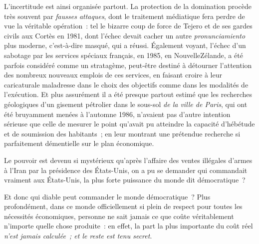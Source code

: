 \documentclass[french,twoside]{book} %
\def\bignobreak{\ifdim\lastskip<\bigskipamount
  \removelastskip\nopagebreak\bigskip\fi}
\newcommand{\labelblock}[1]{\bigbreak{\color{rubric}\noindent\textbf{#1}\par}\bignobreak}
\begin{document}
L’incertitude est ainsi organisée partout. La protection de la domination procède très souvent par \emph{fausses attaques}, dont le traitement médiatique fera perdre de vue la véritable opération : tel le bizarre coup de force de Tejero et de ses gardes civils aux Cortès en 1981, dont l’échec devait cacher un autre \emph{pronunciamiento} plus moderne, c’est-à-dire masqué, qui a réussi. Également voyant, l’échec d’un sabotage par les services spéciaux français, en 1985, en NouvelleZélande, a été parfois considéré comme un stratagème, peut-être destiné à détourner l’attention des nombreux nouveaux emplois de ces services, en faisant croire à leur caricaturale maladresse dans le choix des objectifs comme dans les modalités de l’exécution. Et plus assurément il a été presque partout estimé que les recherches géologiques d’un gisement pétrolier dans le sous-sol \emph{de la ville de Paris}, qui ont été bruyamment menées à l’automne 1986, n’avaient pas d’autre intention sérieuse que celle de mesurer le point qu’avait pu atteindre la capacité d’hébétude et de soumission des habitants ; en leur montrant une prétendue recherche si parfaitement démentielle sur le plan économique.\par
Le pouvoir est devenu si mystérieux qu’après l’affaire des ventes illégales d’armes à l’Iran par la présidence des États-Unis, on a pu se demander qui commandait vraiment aux États-Unis, la plus forte puissance du monde dit démocratique ?\par
Et donc qui diable peut commander le monde démocratique ? Plus profondément, dans ce monde officiellement si plein de respect pour toutes les nécessités économiques, personne ne sait jamais ce que coûte véritablement n’importe quelle chose produite : en effet, la part la plus importante du coût réel \emph{n’est jamais calculée ; et le reste est tenu secret}.\par

\labelblock{XIX}
\end{document}
